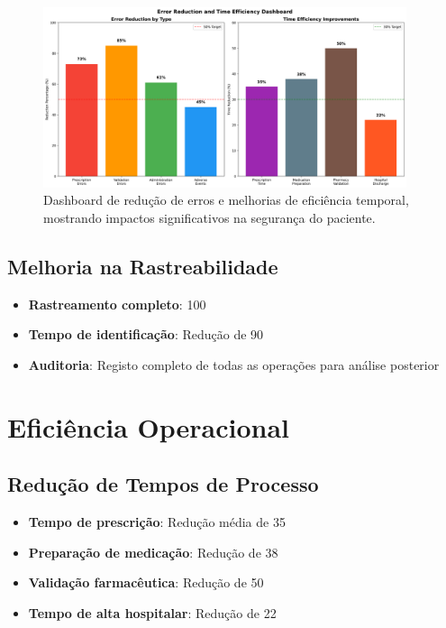 \begin{figure}[htbp]
    \centering
    \includegraphics[width=0.95\textwidth]{images/generated/error_reduction_dashboard.png}
    \caption{Dashboard de redução de erros e melhorias de eficiência temporal, mostrando impactos significativos na segurança do paciente.}
    \label{fig:error-reduction}
\end{figure}

\subsection{Melhoria na Rastreabilidade}

\begin{itemize}
    \item \textbf{Rastreamento completo}: 100%
    \item \textbf{Tempo de identificação}: Redução de 90%
    \item \textbf{Auditoria}: Registo completo de todas as operações para análise posterior
\end{itemize}

\section{Eficiência Operacional}

\subsection{Redução de Tempos de Processo}

\begin{itemize}
    \item \textbf{Tempo de prescrição}: Redução média de 35%
    \item \textbf{Preparação de medicação}: Redução de 38%
    \item \textbf{Validação farmacêutica}: Redução de 50%
    \item \textbf{Tempo de alta hospitalar}: Redução de 22%
\end{itemize}

